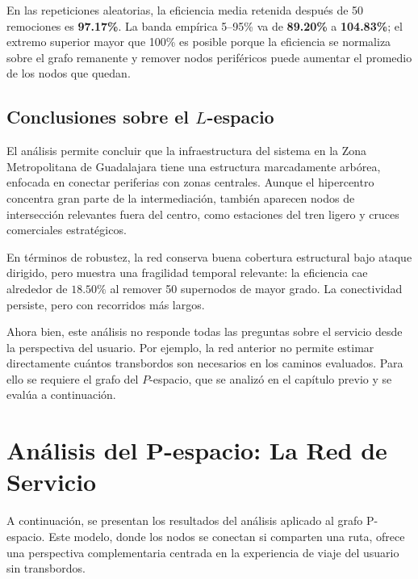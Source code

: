             En las repeticiones aleatorias, la eficiencia media retenida después de 50 remociones es \textbf{97.17\%}. La banda empírica 5--95\% va de \textbf{89.20\%} a \textbf{104.83\%}; el extremo superior mayor que 100\% es posible porque la eficiencia se normaliza sobre el grafo remanente y remover nodos periféricos puede aumentar el promedio de los nodos que quedan.

	\subsection{Conclusiones sobre el $L$-espacio}
	    El análisis permite concluir que la infraestructura del sistema en la Zona Metropolitana de Guadalajara tiene una estructura marcadamente arbórea, enfocada en conectar periferias con zonas centrales. Aunque el hipercentro concentra gran parte de la intermediación, también aparecen nodos de intersección relevantes fuera del centro, como estaciones del tren ligero y cruces comerciales estratégicos.

            En términos de robustez, la red conserva buena cobertura estructural bajo ataque dirigido, pero muestra una fragilidad temporal relevante: la eficiencia cae alrededor de \(18.50\%\) al remover 50 supernodos de mayor grado. La conectividad persiste, pero con recorridos más largos.

	    Ahora bien, este análisis no responde todas las preguntas sobre el servicio desde la perspectiva del usuario. Por ejemplo, la red anterior no permite estimar directamente cuántos transbordos son necesarios en los caminos evaluados. Para ello se requiere el grafo del $P$-espacio, que se analizó en el capítulo previo y se evalúa a continuación.

    \section{Análisis del P-espacio: La Red de Servicio}
        A continuación, se presentan los resultados del análisis aplicado al grafo P-espacio. Este modelo, donde los nodos se conectan si comparten una ruta, ofrece una perspectiva complementaria centrada en la experiencia de viaje del usuario sin transbordos.

